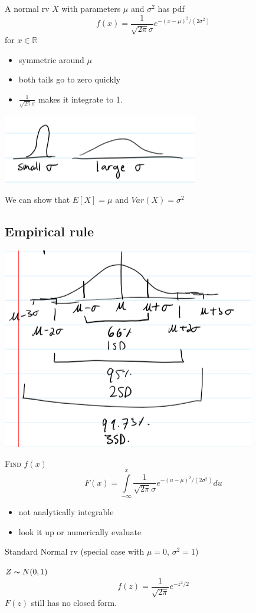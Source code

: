 \begin{defbox}
    A normal rv $ X $ with parameters $ \mu $ and $ \sigma^2 $ has pdf
    \[ f(x)=\frac{1}{\sqrt{2\pi}\sigma}e^{-(x-\mu)^2/(2\sigma^2)}\]
    for $ x\in\mathbb{R} $
\end{defbox}
\begin{itemize}
    \item symmetric around $ \mu $
    \item both tails go to zero quickly
    \item $\frac{1}{\sqrt{2\pi}\sigma}$ makes it integrate to 1.
\end{itemize}

\begin{center}
    \includegraphics{sigma.png}
\end{center}
We can show that $ E[X]=\mu $ and $ Var(X)=\sigma^2 $

\subsection{Empirical rule}
\begin{center}
    \includegraphics{emp.png}
\end{center}

\textsc{Find $ f(x) $}
\[ F(x)=\int\limits_{-\infty}^{x} \frac{1}{\sqrt{2\pi}\sigma}e^{-(u-\mu)^2/(2\sigma^2)} d{u} \]
\begin{itemize}
    \item not analytically integrable
    \item look it up or numerically evaluate
\end{itemize}
Standard Normal rv (special case with $ \mu=0,\,\sigma^2=1 $)

$ Z \thicksim N(0,1) $
\[ f(z)=\frac{1}{\sqrt{2\pi}}e^{-z^2/2} \]
$ F(z) $ still has no closed form.